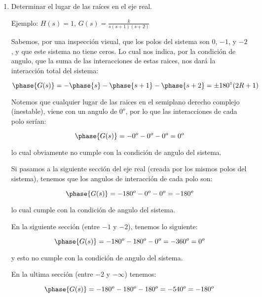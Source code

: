 	\begin{enumerate}
		\item Determinar el lugar de las raíces en el eje real.

		Ejemplo: $H(s) = 1$, $G(s) = \frac{k}{s(s+1)(s+2)}$

		Sabemos, por una inspección visual, que los polos del sistema son $0$, $-1$, y $-2$, y que este sistema no tiene ceros. Lo cual nos indica, por la condición de angulo, que la suma de las interacciones de estas raices, nos dará la interacción total del sistema:

		\begin{equation*}
			\phase{G(s)} = - \phase{s} - \phase{s+1} - \phase{s+2} = \pm 180^{\circ} (2R + 1)
		\end{equation*}

		Notemos que cualquier lugar de las raices en el semiplano derecho complejo (inestable), viene con un angulo de $0^o$, por lo que las interacciones de cada polo serían:

		\begin{equation*}
			\phase{G(s)} = - 0^o - 0^o - 0^o = 0^o
		\end{equation*}

		lo cual obviamente no cumple con la condición de angulo del sistema.

		Si pasamos a la siguiente sección del eje real (creada por los mismos polos del sistema), tenemos que los angulos de interacción de cada polo son:

		\begin{equation*}
			\phase{G(s)} = - 180^o - 0^o - 0^o = -180^o
		\end{equation*}

		lo cual cumple con la condición de angulo del sistema.

		En la siguiente sección (entre $-1$ y $-2$), tenemos lo siguiente:

		\begin{equation*}
			\phase{G(s)} = - 180^o - 180^o - 0^o = -360^o = 0^o
		\end{equation*}

		y esto no cumple con la condición de angulo del sistema.

		En la ultima sección (entre $-2$ y $- \infty$) tenemos:

		\begin{equation*}
			\phase{G(s)} = - 180^o - 180^o - 180^o = -540^o = -180^o
		\end{equation*}


\end{enumerate}

